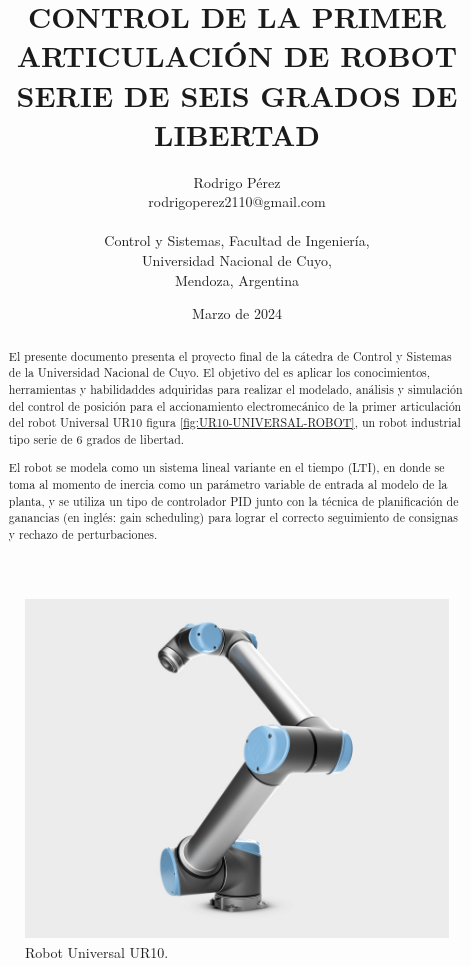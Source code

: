 \documentclass{article}
\title{\textbf{CONTROL DE LA PRIMER ARTICULACIÓN DE ROBOT SERIE DE SEIS GRADOS DE LIBERTAD}}
\author{Rodrigo Pérez \\ rodrigoperez2110@gmail.com \\ \\ Control y Sistemas, Facultad de Ingeniería, \\ Universidad Nacional de Cuyo, \\ Mendoza, Argentina}
\date{Marzo de 2024}
\begin{document}
\begin{sloppypar}

\renewcommand{\tablename}{Tabla}

\maketitle


\begin{figure}[H]
    \centering
    \includegraphics[width=1\textwidth]{UR10-UNIVERSAL-ROBOT}
    \caption{Robot Universal UR10.}
    \label{fig:UR10-UNIVERSAL-ROBOT}
\end{figure}


\begin{abstract}
    El presente documento presenta el proyecto final de la cátedra de Control y Sistemas de la Universidad Nacional de Cuyo.
    El objetivo del es aplicar los conocimientos, herramientas y habilidaddes adquiridas para realizar el modelado, análisis y simulación del control de posición para el accionamiento electromecánico de la primer articulación del robot Universal UR10 figura \ref{fig:UR10-UNIVERSAL-ROBOT}, un robot industrial tipo serie de 6 grados de libertad.

    El robot se modela como un sistema lineal variante en el tiempo (LTI), en donde se toma al momento de inercia como un parámetro variable de entrada al modelo de la planta, y se utiliza un tipo de controlador PID junto con la técnica de planificación de ganancias (en inglés: gain scheduling) para lograr el correcto seguimiento de consignas y rechazo de perturbaciones.


\end{abstract}
\end{sloppypar}
\end{document}
